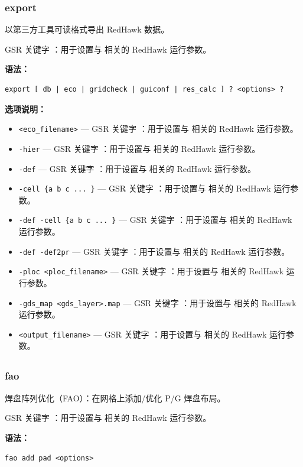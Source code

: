 \subsubsection*{export}

以第三方工具可读格式导出 RedHawk 数据。

GSR 关键字 ：用于设置与  相关的 RedHawk 运行参数。

\textbf{语法：}
\begin{lstlisting}
export [ db | eco | gridcheck | guiconf | res_calc ] ? <options> ?
\end{lstlisting}

\textbf{选项说明：}
\begin{itemize}
\item \texttt{<eco\_filename>} — GSR 关键字 ：用于设置与  相关的 RedHawk 运行参数。
\item \texttt{-hier} — GSR 关键字 ：用于设置与  相关的 RedHawk 运行参数。
\item \texttt{-def} — GSR 关键字 ：用于设置与  相关的 RedHawk 运行参数。
\item \texttt{-cell \{a b c ... \}} — GSR 关键字 ：用于设置与  相关的 RedHawk 运行参数。
\item \texttt{-def -cell \{a b c ... \}} — GSR 关键字 ：用于设置与  相关的 RedHawk 运行参数。
\item \texttt{-def -def2pr} — GSR 关键字 ：用于设置与  相关的 RedHawk 运行参数。
\item \texttt{-ploc <ploc\_filename>} — GSR 关键字 ：用于设置与  相关的 RedHawk 运行参数。
\item \texttt{-gds\_map <gds\_layer>.map} — GSR 关键字 ：用于设置与  相关的 RedHawk 运行参数。
\item \texttt{<output\_filename>} — GSR 关键字 ：用于设置与  相关的 RedHawk 运行参数。
\end{itemize}

\subsection{}
\subsubsection*{fao}

焊盘阵列优化（FAO）：在网格上添加/优化 P/G 焊盘布局。

GSR 关键字 ：用于设置与  相关的 RedHawk 运行参数。

\textbf{语法：}
\begin{lstlisting}
fao add pad <options>
\end{lstlisting}

